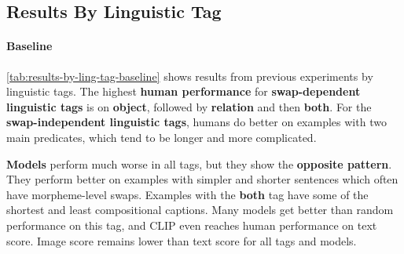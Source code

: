 \subsection{Results By Linguistic Tag}

\paragraph{Baseline}

\cref{tab:results-by-ling-tag-baseline} shows results from previous experiments \cite{thrush2022winoground} by linguistic tags. The highest \textbf{human performance} for \textbf{swap-dependent linguistic tags} is on \textbf{object}, followed by \textbf{relation} and then \textbf{both}. For the \textbf{swap-independent linguistic tags}, humans do better on examples with two main predicates, which tend to be longer and more complicated.

\textbf{Models} perform much worse in all tags, but they show the \textbf{opposite pattern}. They perform better on examples with simpler and shorter sentences which often have morpheme-level swaps. Examples with the \textbf{both} tag have some of the shortest and least compositional captions. Many models get better than random performance on this tag, and CLIP even reaches human performance on text score. Image score remains lower than text score for all tags and models.

